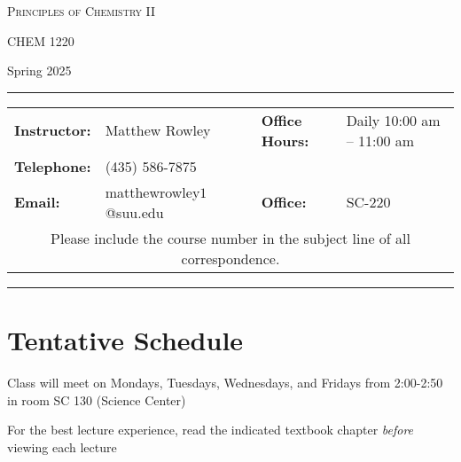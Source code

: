 \documentclass[12pt, letterpaper]{article}
\begin{document}
\begin{center}
	{\Large \textsc{Principles of Chemistry II}}
	
	CHEM 1220
\end{center}

\begin{center}
	{\large Spring 2025}
\end{center}
\begin{center}
	\rule{0.99\textwidth}{0.4pt}
	\begin{tabular}{llcll}
		\textbf{Instructor:} & Matthew Rowley           &  & \textbf{Office Hours:} & Daily 10:00 am -- 11:00 am \\
		\textbf{Telephone:}  & (435) 586-7875           &  &                        &                            \\
		\textbf{Email:}      & matthewrowley$1$@suu.edu &  & \textbf{Office:}       & SC-220                     \\
		\multicolumn{5}{c}{Please include the course number in the subject line of all correspondence.}
	\end{tabular}
	\rule{0.99\textwidth}{0.4pt}
\end{center}

\section*{Tentative Schedule}
Class will meet on Mondays, Tuesdays, Wednesdays, and Fridays from 2:00-2:50 in room SC 130 (Science Center)

\noindent For the best lecture experience, read the indicated textbook chapter \emph{before} viewing each lecture
\end{document}
